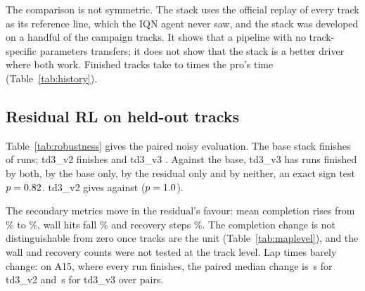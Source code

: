 \documentclass[conference]{IEEEtran}
\newcommand{\vseven}{v7\xspace}
\newcommand{\vnine}{v9\_rl\xspace}
\begin{document}
\begin{table}[t]
\caption{Generalisation. Classical stack (v3b, no learned components) on the campaign, one run per track,
and the era-1 IQN agent, \IQNHockRuns greedy runs per track. ``Other maps'' are A01, A03, A05, A07 and A11.}
\label{tab:generalisation}
\centering
\footnotesize

\end{table}

The comparison is not symmetric. The stack uses the official replay of every track as its reference line,
which the IQN agent never saw, and the stack was developed on a handful of the campaign tracks. It shows that
a pipeline with no track-specific parameters transfers; it does not show that the stack is a better driver
where both work. Finished tracks take \TimeRatioLo to \TimeRatioHi times the pro's time
(Table~\ref{tab:history}).

\subsection{Residual RL on held-out tracks}

Table~\ref{tab:robustness} gives the paired noisy evaluation. The base stack finishes \BaseFin of \TestRuns
runs; td3\_v2 finishes \VeightFin and td3\_v3 \VnineFin. Against the base, td3\_v3 has \PairsBoth runs
finished by both, \PairsOnlyBase by the base only, \PairsOnlyRL by the residual only and \PairsNeither by
neither, an exact sign test $p=0.82$. td3\_v2 gives \VeightOnlyBase against \VeightOnlyRL
($p=1.0$).

The secondary metrics move in the residual's favour: mean completion rises from \BaseCompl\% to
\VnineCompl\%, wall hits fall \WallsDropPct\% and recovery steps \RecoveryDropPct\%. The completion change is not
distinguishable from zero once tracks are the unit (Table~\ref{tab:maplevel}), and the wall and recovery counts were not tested at the track level. Lap times barely change: on
A15, where every run finishes, the paired median change is \AfifteenDeltaVeight\,s for td3\_v2 and
\AfifteenDeltaVnine\,s for td3\_v3 over \AfifteenPairs pairs.

\begin{table}[t]
\caption{Held-out tracks, \RunsPerMap paired runs per track under steering noise. Finishes out of \RunsPerMap; mean
completion; discordant pairs (finished by \vseven only / by \vnine only).}
\label{tab:robustness}
\centering
\resizebox{\columnwidth}{!}{}
\end{table}
\end{document}
